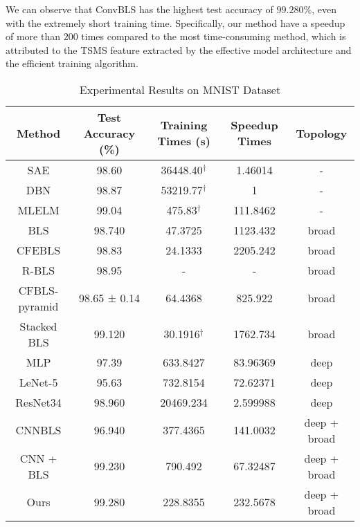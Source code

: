 \documentclass[lettersize,journal]{IEEEtran}
\begin{document}
We can observe that ConvBLS has the highest test accuracy of $99.280\%$, even with the extremely short training time. Specifically, our method have a speedup of more than $200$ times compared to the most time-consuming method, which is attributed to the TSMS feature extracted by the effective model architecture and the efficient training algorithm.
\begin{table*}[!t]
\caption{Experimental Results on MNIST Dataset\label{tab:mnist}}
\centering
\begin{tabular}{c c c c c}
\hline\hline
Method & Test Accuracy (\%) & Training Times (s) & Speedup Times & Topology\\
\hline
SAE \cite{tang2015extreme} & 98.60 & 36448.40$^\dag$ & 1.46014 & - \\
DBN \cite{tang2015extreme} & 98.87 & 53219.77$^\dag$ & 1 & - \\
MLELM \cite{tang2015extreme} & 99.04 & 475.83$^\dag$ & 111.8462 & - \\
\hline
BLS \cite{chen2017broad} & 98.740 & 47.3725 & 1123.432 & broad \\
CFEBLS \cite{chen2018universal} & 98.83 & 24.1333 & 2205.242 & broad \\
R-BLS \cite{zhang2018rich} & 98.95 & - & - & broad \\
CFBLS-pyramid \cite{zhang2020analysis} & 98.65 ± 0.14 & 64.4368 & 825.922 & broad \\
Stacked BLS \cite{liu2020stacked} & 99.120 & 30.1916$^\dag$ & 1762.734 & broad \\
\hline
MLP \cite{bishop2006pattern} & 97.39 & 633.8427 & 83.96369 & deep \\
LeNet-5 \cite{lecun1989handwritten} & 95.63 & 732.8154 & 72.62371 & deep \\
ResNet34 \cite{he2016deep} & 98.960 & 20469.234 & 2.599988 & deep \\
\hline
CNNBLS \cite{yang2018cnn} & 96.940 & 377.4365 & 141.0032 & deep + broad \\
CNN + BLS \cite{li2019cnn} & 99.230 & 790.492 & 67.32487 & deep + broad \\
Ours & 99.280 & 228.8355 & 232.5678 & deep + broad \\
\hline\hline
\end{tabular}
\end{table*}
\end{document}
